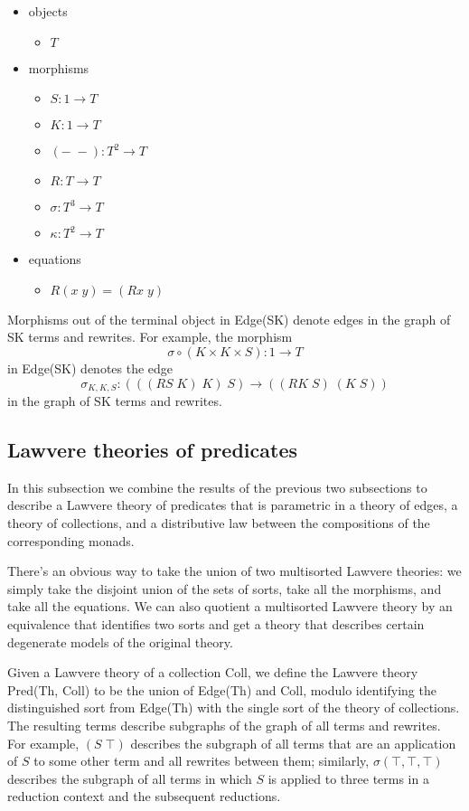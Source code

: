 \documentclass[submission,copyright,creativecommons]{eptcs}
\newcommand{\maps}{\colon}
\begin{document}
\begin{itemize}
  \item objects
    \begin{itemize}
      \item $T$
    \end{itemize}
  \item morphisms
    \begin{itemize}
      \item $S\maps 1 \to T$
      \item $K\maps 1 \to T$
      \item $(-\; -)\maps T^2 \to T$
      \item $R\maps T \to T$
      \item $\sigma\maps T^3 \to T$
      \item $\kappa\maps T^2 \to T$
    \end{itemize}
  \item equations
    \begin{itemize}
      \item $R(x\; y) = (Rx\; y)$
    \end{itemize}
\end{itemize}

Morphisms out of the terminal object in Edge(SK) denote edges in the graph of SK terms and rewrites.  For example, the morphism 
\[\sigma \circ (K \times K \times S)\maps 1 \to T\]
in Edge(SK) denotes the edge
\[\sigma_{K,K,S}\maps (((RS\; K)\; K)\; S) \to ((RK\; S)\; (K\; S))\]
in the graph of SK terms and rewrites.

\subsection{Lawvere theories of predicates}

In this subsection we combine the results of the previous two subsections to describe a Lawvere theory of predicates that is parametric in a theory of edges, a theory of collections, and a distributive law between the compositions of the corresponding monads.  

There's an obvious way to take the union of two multisorted Lawvere theories: we simply take the disjoint union of the sets of sorts, take all the morphisms, and take all the equations.  We can also quotient a multisorted Lawvere theory by an equivalence that identifies two sorts and get a theory that describes certain degenerate models of the original theory.

Given a Lawvere theory of a collection Coll, we define the Lawvere theory Pred(Th, Coll) to be the union of Edge(Th) and Coll, modulo identifying the distinguished sort from Edge(Th) with the single sort of the theory of collections.  The resulting terms describe subgraphs of the graph of all terms and rewrites.  For example, $(S\; \top)$ describes the subgraph of all terms that are an application of $S$ to some other term and all rewrites between them; similarly, $\sigma(\top, \top, \top)$ describes the subgraph of all terms in which $S$ is applied to three terms in a reduction context and the subsequent reductions.
\end{document}
